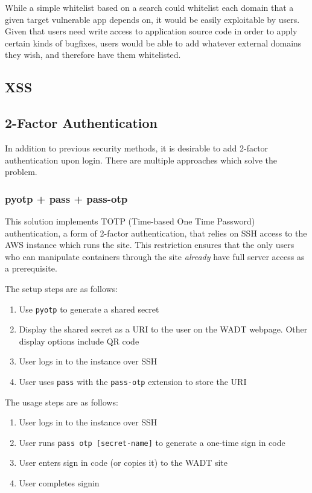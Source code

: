 \documentclass[12pt]{article}
\begin{document}
While a simple whitelist based on a search could whitelist each domain that a given target vulnerable app depends on, it would be easily exploitable by users. Given that users need write access to application source code in order to apply certain kinds of bugfixes, users would be able to add whatever external domains they wish, and therefore have them whitelisted.


\subsection{XSS}

\subsection{2-Factor Authentication}
In addition to previous security methods, it is desirable to add 2-factor authentication upon login. There are multiple approaches which solve the problem.

\subsubsection{pyotp + pass + pass-otp}
This solution implements TOTP (Time-based One Time Password) authentication, a form of 2-factor authentication, that relies on SSH access to the AWS instance which runs the site. This restriction ensures that the only users who can manipulate containers through the site \textit{already} have full server access as a prerequisite.

The setup steps are as follows:
\begin{enumerate}
	\item Use \texttt{pyotp} to generate a shared secret
	\item Display the shared secret as a URI to the user on the WADT webpage. Other display options include QR code
	\item User logs in to the instance over SSH
	\item User uses \texttt{pass} with the \texttt{pass-otp} extension to store the URI
\end{enumerate}

The usage steps are as follows:
\begin{enumerate}
	\item User logs in to the instance over SSH
	\item User runs \texttt{pass otp [secret-name]} to generate a one-time sign in code
	\item User enters sign in code (or copies it) to the WADT site
	\item User completes signin
\end{enumerate}
\end{document}
